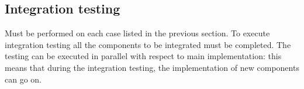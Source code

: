 \documentclass[../DD.tex]{subfiles}
\begin{document}
		\subsection{Integration testing} Must be performed on each case listed in the previous section. To execute integration testing all the components to be integrated must be completed. The testing can be executed in parallel with respect to main implementation: this means that during the integration testing, the implementation of new components can go on.\\

\thispagestyle{fancy}
 
\end{document}
